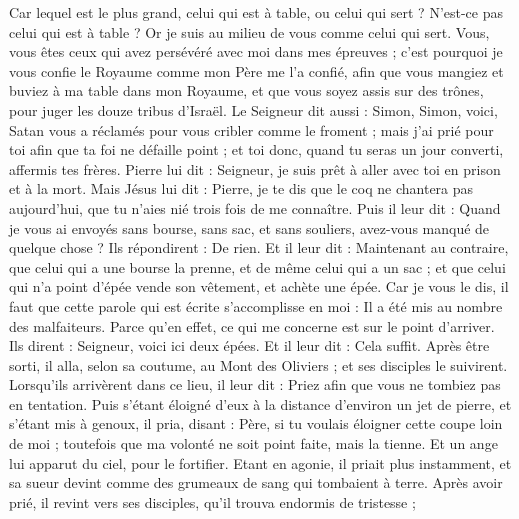 \begin{multicols}{2}
Car lequel est le plus grand, celui qui est à table, ou celui qui sert ? N'est-ce pas celui qui est à table ? Or je suis au milieu de vous comme celui qui sert.
Vous, vous êtes ceux qui avez persévéré avec moi dans mes épreuves ;
c'est pourquoi je vous confie le Royaume comme mon Père me l'a confié,
afin que vous mangiez et buviez à ma table dans mon Royaume, et que vous soyez assis sur des trônes, pour juger les douze tribus d'Israël.
Le Seigneur dit aussi : Simon, Simon, voici, Satan vous a réclamés pour vous cribler comme le froment ;
mais j'ai prié pour toi afin que ta foi ne défaille point ; et toi donc, quand tu seras un jour converti, affermis tes frères.
Pierre lui dit : Seigneur, je suis prêt à aller avec toi en prison et à la mort.
Mais Jésus lui dit : Pierre, je te dis que le coq ne chantera pas aujourd'hui, que tu n'aies nié trois fois de me connaître.
Puis il leur dit : Quand je vous ai envoyés sans bourse, sans sac, et sans souliers, avez-vous manqué de quelque chose ? Ils répondirent : De rien.
Et il leur dit : Maintenant au contraire, que celui qui a une bourse la prenne, et de même celui qui a un sac ; et que celui qui n'a point d'épée vende son vêtement, et achète une épée.
Car je vous le dis, il faut que cette parole qui est écrite s'accomplisse en moi : Il a été mis au nombre des malfaiteurs. Parce qu'en effet, ce qui me concerne est sur le point d'arriver.
Ils dirent : Seigneur, voici ici deux épées. Et il leur dit : Cela suffit.
Après être sorti, il alla, selon sa coutume, au Mont des Oliviers ; et ses disciples le suivirent.
Lorsqu'ils arrivèrent dans ce lieu, il leur dit : Priez afin que vous ne tombiez pas en tentation.
Puis s'étant éloigné d'eux à la distance d'environ un jet de pierre, et s'étant mis à genoux, il pria,
disant : Père, si tu voulais éloigner cette coupe loin de moi ; toutefois que ma volonté ne soit point faite, mais la tienne.
Et un ange lui apparut du ciel, pour le fortifier.
Etant en agonie, il priait plus instamment, et sa sueur devint comme des grumeaux de sang qui tombaient à terre.
Après avoir prié, il revint vers ses disciples, qu'il trouva endormis de tristesse ;

\end{multicols}
